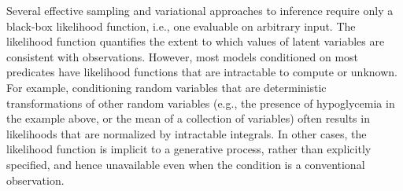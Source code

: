 



Several effective sampling  \citep{andrieu2003introduction} and variational  \citep{jordan1999introduction, ranganath2014black} approaches to inference require only a black-box likelihood function, i.e., one evaluable on arbitrary input.
The likelihood function quantifies the extent to which values of latent variables are consistent with observations. 
However, most models conditioned on most predicates have likelihood functions that are intractable to compute or unknown.
For example, conditioning random variables that are deterministic transformations of other random variables (e.g., the presence of hypoglycemia in the example above, or the mean of a collection of variables) often results in likelihoods that are normalized by intractable integrals.	
In other cases, the likelihood function is implicit to a generative process, rather than explicitly specified, and hence unavailable even when the condition is a conventional observation.

